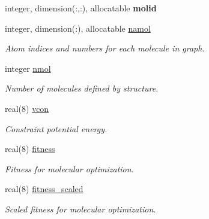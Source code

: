 \begin{DoxyCompactItemize}
\mbox{\label{structchemstr_1_1cxs_a8611c496d080feeb747cf70d247e91be}} 
integer, dimension(\+:,\+:), allocatable {\bfseries molid}
\item 
\mbox{\label{structchemstr_1_1cxs_a431d5ccacf2294a4d0e28911d74a0c01}} 
integer, dimension(\+:), allocatable \mbox{\hyperlink{structchemstr_1_1cxs_a431d5ccacf2294a4d0e28911d74a0c01}{namol}}
\begin{DoxyCompactList}\small\item\em Atom indices and numbers for each molecule in graph. \end{DoxyCompactList}\item 
\mbox{\label{structchemstr_1_1cxs_a8c33378afa3c426787c0a6df0026dd77}} 
integer \mbox{\hyperlink{structchemstr_1_1cxs_a8c33378afa3c426787c0a6df0026dd77}{nmol}}
\begin{DoxyCompactList}\small\item\em Number of molecules defined by structure. \end{DoxyCompactList}\item 
\mbox{\label{structchemstr_1_1cxs_a0cc00b5504ff1b7121b384fd6e38f819}} 
real(8) \mbox{\hyperlink{structchemstr_1_1cxs_a0cc00b5504ff1b7121b384fd6e38f819}{vcon}}
\begin{DoxyCompactList}\small\item\em Constraint potential energy. \end{DoxyCompactList}\item 
\mbox{\label{structchemstr_1_1cxs_a53efe991273d0cbdf6e7f7db4c84d9ac}} 
real(8) \mbox{\hyperlink{structchemstr_1_1cxs_a53efe991273d0cbdf6e7f7db4c84d9ac}{fitness}}
\begin{DoxyCompactList}\small\item\em Fitness for molecular optimization. \end{DoxyCompactList}\item 
\mbox{\label{structchemstr_1_1cxs_a6c3b969eb52f0b81eed9df8d6887b969}} 
real(8) \mbox{\hyperlink{structchemstr_1_1cxs_a6c3b969eb52f0b81eed9df8d6887b969}{fitness\+\_\+scaled}}
\begin{DoxyCompactList}\small\item\em Scaled fitness for molecular optimization. \end{DoxyCompactList}\item 

\end{DoxyCompactItemize}
